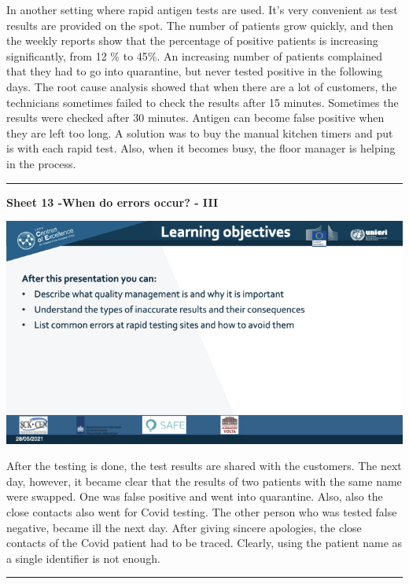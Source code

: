 \documentclass[
]{book}
\begin{document}
In another setting where rapid antigen tests are used. It's very
convenient as test results are provided on the spot. The number of
patients grow quickly, and then the weekly reports show that the
percentage of positive patients is increasing significantly, from 12 \%
to 45\%. An increasing number of patients complained that they had to go
into quarantine, but never tested positive in the following days. The
root cause analysis showed that when there are a lot of customers, the
technicians sometimes failed to check the results after 15 minutes.
Sometimes the results were checked after 30 minutes. Antigen can become
false positive when they are left too long. A solution was to buy the
manual kitchen timers and put is with each rapid test. Also, when it
becomes busy, the floor manager is helping in the process.

\begin{center}\rule{0.5\linewidth}{0.5pt}\end{center}

\textbf{Sheet 13 -When do errors occur? - III}

\includegraphics{images/m04/m04_Quality_management_v3.003.jpeg}

After the testing is done, the test results are shared with the
customers. The next day, however, it became clear that the results of
two patients with the same name were swapped. One was false positive and
went into quarantine. Also, also the close contacts also went for Covid
testing. The other person who was tested false negative, became ill the
next day. After giving sincere apologies, the close contacts of the
Covid patient had to be traced. Clearly, using the patient name as a
single identifier is not enough.

\begin{center}\rule{0.5\linewidth}{0.5pt}\end{center}
\end{document}
